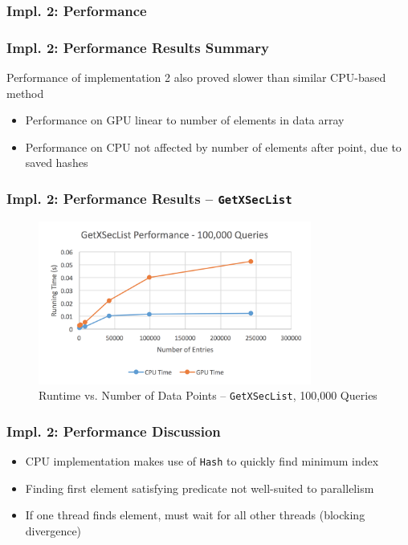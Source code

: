 \documentclass{beamer}
\begin{document}
\subsubsection{Impl. 2: Performance}
\begin{frame}
\frametitle{Impl. 2: Performance Results Summary}
Performance of implementation 2 also proved slower than 
similar CPU-based method
\begin{itemize}
\item Performance on GPU linear to number of elements in data array
\item Performance on CPU not affected by number of elements after point, due to saved hashes
\end{itemize}
\end{frame}

\begin{frame}
\frametitle{Impl. 2: Performance Results -- \texttt{GetXSecList}}
\begin{figure}
\centering
\includegraphics[width=0.8\textwidth]{images/getxseclist_100000.png}
\caption{Runtime vs. Number of Data Points -- \texttt{GetXSecList}, 100,000 Queries}
\end{figure}
\end{frame}

\begin{frame}
\frametitle{Impl. 2: Performance Discussion}
\begin{itemize}
\item CPU implementation makes use of \texttt{Hash} to quickly find minimum index
\item Finding first element satisfying predicate not well-suited to parallelism
\item If one thread finds element, must wait for all other threads (blocking divergence)
\end{itemize}
\end{frame}
\end{document}
